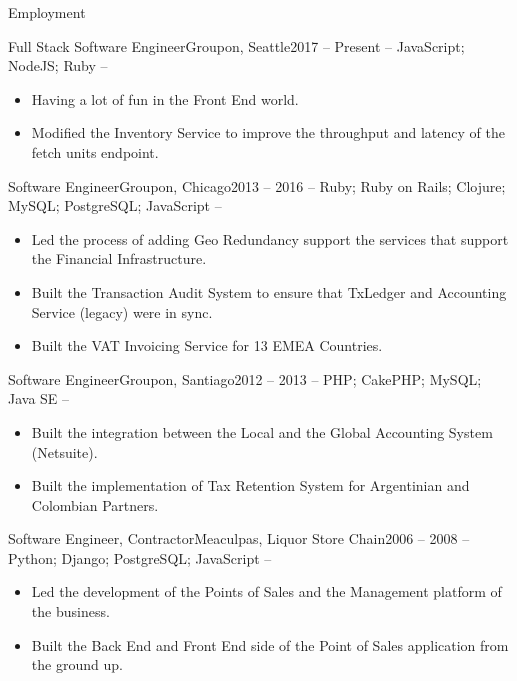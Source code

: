 \documentclass[]{mcdowellcv}
\begin{document}
	\makeheader
	\begin{cvsection}{Employment}
		\begin{cvsubsection}{Full Stack Software Engineer}{Groupon, Seattle}{2017 -- Present}
			 -- JavaScript; NodeJS; Ruby --
			\begin{itemize}
			 	\item Having a lot of fun in the Front End world.
				\item Modified the Inventory Service to improve the throughput and latency of the fetch units endpoint.
			\end{itemize}
		\end{cvsubsection}
		\begin{cvsubsection}{Software Engineer}{Groupon, Chicago}{2013 -- 2016}
			 -- Ruby; Ruby on Rails; Clojure; MySQL; PostgreSQL; JavaScript --
			\begin{itemize}
				\item Led the process of adding Geo Redundancy support the services that support the Financial Infrastructure.
				\item Built the Transaction Audit System to ensure that TxLedger and Accounting Service (legacy) were in sync.
				\item Built the VAT Invoicing Service for 13 EMEA Countries.
			\end{itemize}
		\end{cvsubsection}
		\begin{cvsubsection}{Software Engineer}{Groupon, Santiago}{2012 -- 2013}
			 -- PHP; CakePHP; MySQL; Java SE --
			\begin{itemize}
				\item Built the integration between the Local and the Global Accounting System (Netsuite).
				\item Built the implementation of Tax Retention System for Argentinian and Colombian Partners.
			\end{itemize}
		\end{cvsubsection}		
		\begin{cvsubsection}{Software Engineer, Contractor}{Meaculpas, Liquor Store Chain}{2006 -- 2008}
			-- Python; Django; PostgreSQL; JavaScript --
			\begin{itemize}
				\item Led the development of the Points of Sales and the Management platform of the business.
				\item Built the Back End and Front End side of the Point of Sales application from the ground up.

\end{itemize}
\end{cvsubsection}
\end{cvsection}
\end{document}
